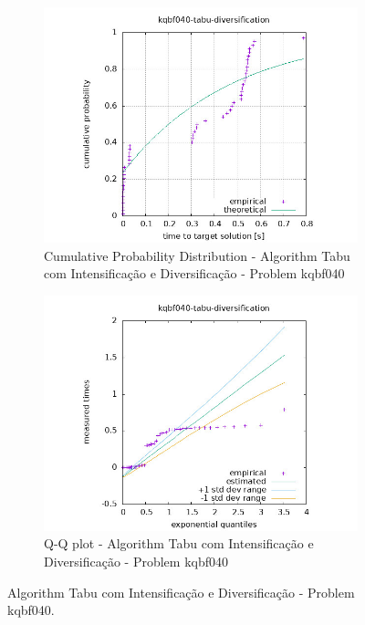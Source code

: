 \begin{figure}[H]
    \centering
    \begin{subfigure}{0.49\textwidth}
        \includegraphics[width=\textwidth]{figure/ttt_plot/kqbf040-tabu-diversification-exp.jpeg}
        \caption{Cumulative Probability Distribution - Algorithm Tabu com Intensificação e Diversificação - Problem kqbf040}
        \label{fig:tabu-com intensificação e diversificação-kqbf040-exp}
    \end{subfigure}
    \hfill
    \begin{subfigure}{0.49\textwidth}
        \includegraphics[width=\textwidth]{figure/ttt_plot/kqbf040-tabu-diversification-qq.jpeg}
        \caption{Q-Q plot - Algorithm Tabu com Intensificação e Diversificação - Problem kqbf040}
        \label{fig:tabu-com intensificação e diversificação-kqbf040-qq}
    \end{subfigure}
    \caption{Algorithm Tabu com Intensificação e Diversificação - Problem kqbf040.}
    \label{fig:tabu-com intensificação e diversificação-kqbf040}
\end{figure}


